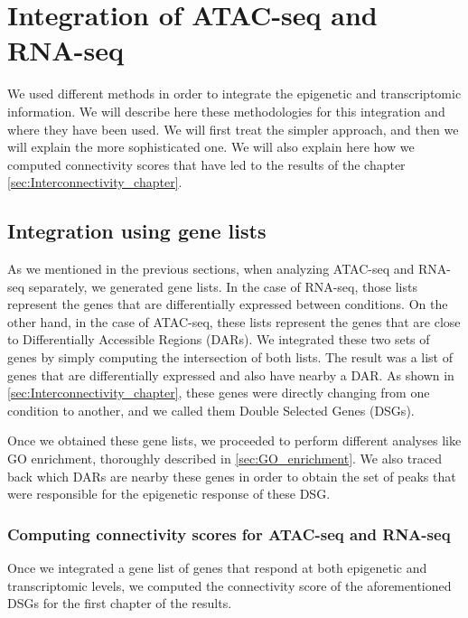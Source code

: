 \section{Integration of ATAC-seq and RNA-seq}

\label{sec:integration_atac_rna}

We used different methods in order to integrate the epigenetic and transcriptomic information. We will describe here these methodologies for this integration and where they have been used. We will first treat the simpler approach, and then we will explain the more sophisticated one. We will also explain here how we computed connectivity scores that have led to the results of the chapter \ref{sec:Interconnectivity_chapter}.

\subsection{Integration using gene lists}

As we mentioned in the previous sections, when analyzing ATAC-seq and RNA-seq separately, we generated gene lists. In the case of RNA-seq, those lists represent the genes that are differentially expressed between conditions. On the other hand, in the case of ATAC-seq, these lists represent the genes that are close to Differentially Accessible Regions (DARs). We integrated these two sets of genes by simply computing the intersection of both lists. The result was a list of genes that are differentially expressed and also have nearby a DAR. As shown in \ref{sec:Interconnectivity_chapter}, these genes were directly changing from one condition to another, and we called them Double Selected Genes (DSGs). 

Once we obtained these gene lists, we proceeded to perform different analyses like GO enrichment, thoroughly described in \ref{sec:GO_enrichment}. We also traced back which DARs are nearby these genes in order to obtain the set of peaks that were responsible for the epigenetic response of these DSG.

\subsubsection{Computing connectivity scores for ATAC-seq and RNA-seq}

Once we integrated a gene list of genes that respond at both epigenetic and transcriptomic levels, we computed the connectivity score of the aforementioned DSGs for the first chapter of the results.

